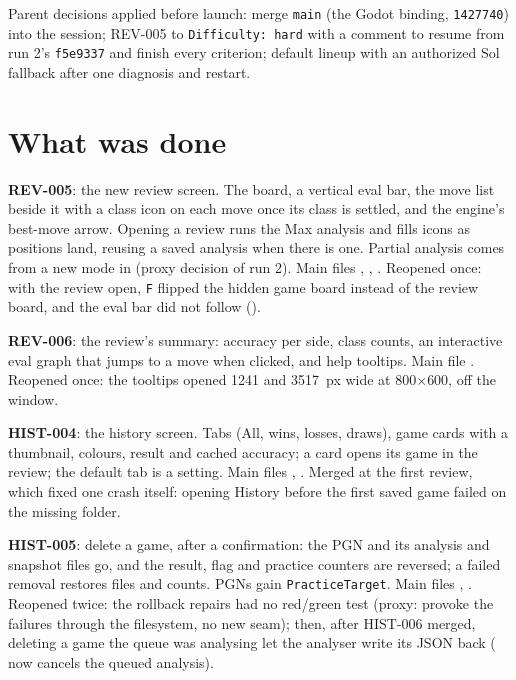 \documentclass[11pt,a4paper]{article}
\begin{document}
Parent decisions applied before launch: merge \texttt{main} (the Godot binding,
\texttt{1427740}) into the session; REV-005 to \texttt{Difficulty: hard} with a comment to resume
from run 2's \texttt{f5e9337} and finish every criterion; default lineup with an authorized Sol
fallback after one diagnosis and restart.

\section*{What was done}

\textbf{REV-005}: the new review screen. The board, a vertical eval bar, the move list beside it
with a class icon on each move once its class is settled, and the engine's best-move arrow.
Opening a review runs the Max analysis and fills icons as positions land, reusing a saved
analysis when there is one. Partial analysis comes from a new mode in
 (proxy decision of run 2). Main files ,
, . Reopened once: with the review open, \texttt{F}
flipped the hidden game board instead of the review board, and the eval bar did not follow
().

\textbf{REV-006}: the review's summary: accuracy per side, class counts, an interactive eval
graph that jumps to a move when clicked, and help tooltips. Main file .
Reopened once: the tooltips opened 1241 and 3517~px wide at 800$\times$600, off the window.

\textbf{HIST-004}: the history screen. Tabs (All, wins, losses, draws), game cards with a
thumbnail, colours, result and cached accuracy; a card opens its game in the review; the default
tab is a setting. Main files , . Merged at the
first review, which fixed one crash itself: opening History before the first saved game failed
on the missing folder.

\textbf{HIST-005}: delete a game, after a confirmation: the PGN and its analysis and snapshot
files go, and the result, flag and practice counters are reversed; a failed removal restores
files and counts. PGNs gain \texttt{PracticeTarget}. Main files ,
. Reopened twice: the rollback repairs had no red/green test (proxy:
provoke the failures through the filesystem, no new seam); then, after HIST-006 merged, deleting
a game the queue was analysing let the analyser write its JSON back
( now cancels the queued analysis).
\end{document}
